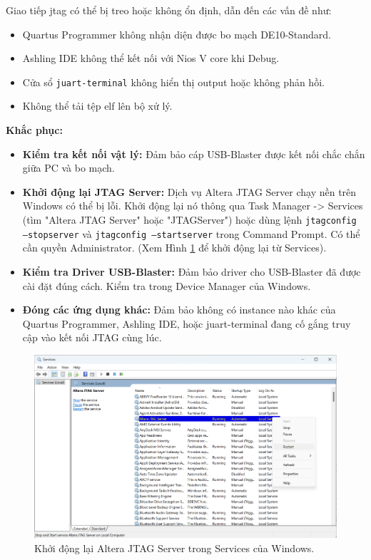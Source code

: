 Giao tiếp \acrshort{jtag} có thể bị treo hoặc không ổn định, dẫn đến các vấn đề như:
\begin{itemize}
    \item Quartus Programmer không nhận diện được bo mạch DE10-Standard.
    \item Ashling IDE không thể kết nối với Nios V core khi Debug.
    \item Cửa sổ \texttt{juart-terminal} không hiển thị output hoặc không phản hồi.
    \item Không thể tải tệp \acrshort{elf} lên bộ xử lý.
\end{itemize}
\textbf{Khắc phục:}
\begin{itemize}
    \item \textbf{Kiểm tra kết nối vật lý:} Đảm bảo cáp USB-Blaster được kết nối chắc chắn giữa PC và bo mạch.
    \item \textbf{Khởi động lại JTAG Server:} Dịch vụ Altera JTAG Server chạy nền trên Windows có thể bị lỗi. Khởi động lại nó thông qua Task Manager -> Services (tìm "Altera JTAG Server" hoặc "JTAGServer") hoặc dùng lệnh \texttt{jtagconfig --stopserver} và \texttt{jtagconfig --startserver} trong Command Prompt. Có thể cần quyền Administrator. (Xem Hình \ref{fig:A2} để khởi động lại từ Services).
    \item \textbf{Kiểm tra Driver USB-Blaster:} Đảm bảo driver cho USB-Blaster đã được cài đặt đúng cách. Kiểm tra trong Device Manager của Windows.
    \item \textbf{Đóng các ứng dụng khác:} Đảm bảo không có instance nào khác của Quartus Programmer, Ashling IDE, hoặc juart-terminal đang cố gắng truy cập vào kết nối JTAG cùng lúc.
\end{itemize}

\begin{figure}[htbp]
    \centering
    \includegraphics[width=\linewidth]{Images/03_69_AppendixRestartJTAGServer.png}
    \caption{Khởi động lại Altera JTAG Server trong Services của Windows.}
    \label{fig:A2}
\end{figure}

